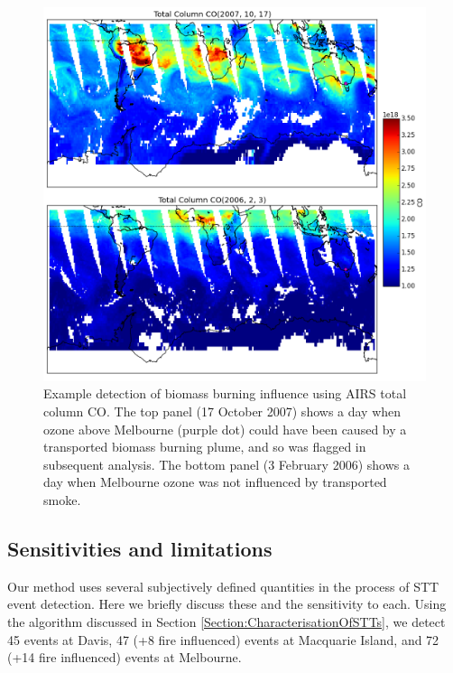 \documentclass{article}
\begin{document}
    \begin{figure}[!htbp]
      \includegraphics[width=\textwidth]{figures/AIRS_compare.png}
      \caption{ Example detection of biomass burning influence using AIRS total column CO. 
	The top panel (17 October 2007) shows a day when ozone above Melbourne (purple dot) could have been caused by a transported biomass burning plume, and so was flagged in subsequent analysis.
	The bottom panel (3 February 2006) shows a day when Melbourne ozone was not influenced by transported smoke.}
      \label{fig:excludedeg}
    \end{figure}
    
  \subsection{Sensitivities and limitations}
    Our method uses several subjectively defined quantities in the process of STT event detection.
    Here we briefly discuss these and the sensitivity to each.
    Using the algorithm discussed in Section \ref{Section:CharacterisationOfSTTs}, we detect 45 events at Davis, 47 (+8 fire influenced) events at Macquarie Island, and 72 (+14 fire influenced) events at Melbourne.
    
\end{document}
